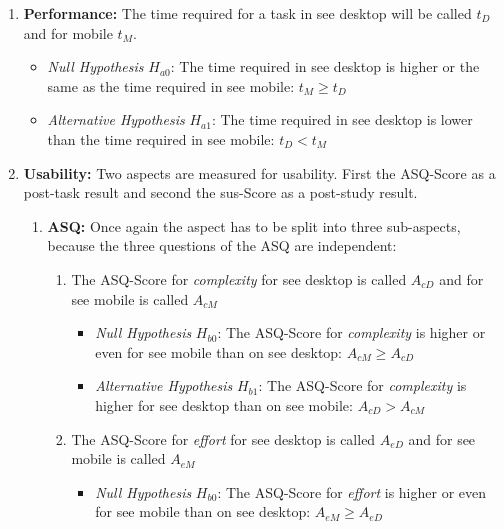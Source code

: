 \begin{enumerate}[{label=\alph*)}]
  \item \textbf{Performance:} The time required for a task in \gls{see} desktop will be called $t_D$ and for mobile $t_M$.
        \begin{itemize}
          \item \textit{Null Hypothesis} $H_{a0}$: The time required in \gls{see} desktop is higher or the same as the time required in \gls{see} mobile: $t_M \geq t_D$
          \item \textit{Alternative Hypothesis} $H_{a1}$: The time required in {\gls{see}} desktop is lower than the time required in \gls{see} mobile: $t_D < t_M$
        \end{itemize}
  \item \textbf{Usability:} Two aspects are measured for \gls{usability}. First the \gls{ASQ}-Score as a \gls{post-task} result and second the \gls{sus}-Score as a \gls{post-study} result.
        \begin{enumerate}[label=\roman*)]
          \item \textbf{ASQ:} Once again the aspect has to be split into three sub-aspects, because the three questions of the \gls{ASQ} are independent:
                \begin{enumerate}[{label=\arabic*)}]
                  \item The \gls{ASQ}-Score for \textit{complexity} for \gls{see} desktop is called $A_{cD}$ and for \gls{see} mobile is called $A_{cM}$
                        \begin{itemize}
                          \item \textit{Null Hypothesis} $H_{b0}$: The \gls{ASQ}-Score for \textit{complexity} is higher or even for \gls{see} mobile than on \gls{see} desktop: $A_{cM} \geq A_{cD}$
                          \item \textit{Alternative Hypothesis} $H_{b1}$: The \gls{ASQ}-Score for \textit{complexity} is higher for \gls{see} desktop than on \gls{see} mobile: $A_{cD} > A_{cM}$
                        \end{itemize}
                  \item The \gls{ASQ}-Score for \textit{effort} for \gls{see} desktop is called $A_{eD}$ and for \gls{see} mobile is called $A_{eM}$
                        \begin{itemize}
                          \item \textit{Null Hypothesis} $H_{b0}$: The \gls{ASQ}-Score for \textit{effort} is higher or even for \gls{see} mobile than on \gls{see} desktop: $A_{eM} \geq A_{eD}$

\end{itemize}
\end{enumerate}
\end{enumerate}
\end{enumerate}
